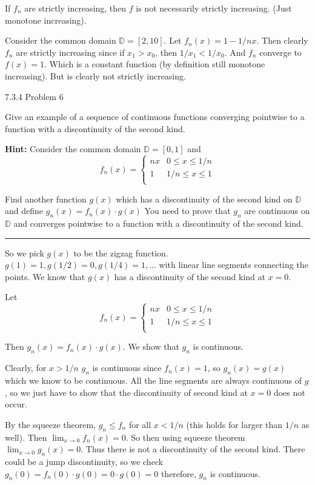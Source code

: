 \documentclass[11pt]{article}
\begin{document}
If $f_n$ are strictly increasing, then $f$ is not necessarily strictly increasing.
(Just monotone increasing).

Consider the common domain $\mathbb{D} = [2, 10]$. Let $f_n(x) = 1 - 1/nx$.
Then clearly $f_n$ are strictly increasing since if $x_1 > x_0$, then $1/x_1 < 1/x_0$.
And $f_n$ converge to $f(x) = 1$. Which is a constant function (by definition still monotone increasing).
But is clearly not strictly increasing.





 7.3.4 Problem 6

Give an example of a sequence of continuous functions converging pointwise to a function
with a discontinuity of the second kind.

\textbf{Hint:} Consider the common domain $\mathbb{D} = [0,1]$ and 
$$f_n (x) = \begin{cases}
    nx & 0 \leq x \leq 1/n \\
    1 & 1/n \leq x \leq 1 \\
\end{cases}$$

Find another function $g(x)$ which has a discontinuity of the second kind on $\mathbb{D}$ and define 
$g_n(x) = f_n(x) \cdot g(x)$
You need to prove that $g_n$ are continuous on $\mathbb{D}$ and converges pointwise to a function with a 
discontinuity of the second kind.

\hrule


So we pick $g(x)$ to be the zigzag function. $g(1) = 1, g(1/2) = 0, g(1/4) = 1, ... $ with linear line segments
connecting the points. We know that $g(x)$ has a discontinuity of the second kind at $x= 0$.

Let $$f_n (x) = \begin{cases}
    nx & 0 \leq x \leq 1/n \\
    1 & 1/n \leq x \leq 1 \\
\end{cases}$$

Then $g_n(x) = f_n(x) \cdot g(x)$. We show that $g_n$ is continuous.

Clearly, for $x > 1/n$ $g_n$ is continuous since $f_n(x) = 1$, so $g_n(x) = g(x)$ which we know to be continuous.
All the line segments are always continuous of $g$, so we just have to show that the discontinuity of second kind
at $x = 0$ does not occur.

By the squeeze theorem, $g_n \leq f_n$ for all $x < 1/n$ (this holds for larger than $1/n$ as well).
Then $\lim_{x\to 0} f_n(x) = 0$. So then using squeeze theorem $\lim_{x\to 0} g_n(x) = 0$.
Thus there is not a discontinuity of the second kind. There could be a jump discontinuity, so we check
$g_n(0) = f_n(0) \cdot g(0) = 0 \cdot g(0) = 0$ therefore, $g_n$ is continuous.
\end{document}
